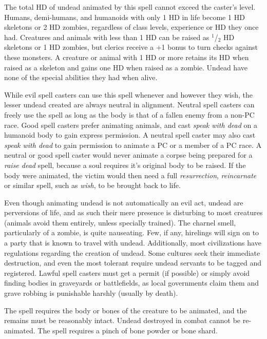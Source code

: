 \begin{multicols}{2}
The total HD of undead animated by this spell cannot exceed the caster's level.  Humans, demi-humans, and humanoids with only 1 HD in life become 1 HD skeletons or 2 HD zombies, regardless of class levels, experience or HD they once had.  Creatures and animals with less than 1 HD can be raised as $^1$/$_2$ HD skeletons or 1 HD zombies, but clerics receive a +1 bonus to turn checks against these monsters.  A creature or animal with 1 HD or more retains its HD when raised as a skeleton and gains one HD when raised as a zombie.  Undead have none of the special abilities they had when alive.  

While evil spell casters can use this spell whenever and however they wish, the lesser undead created are always neutral in alignment.  Neutral spell casters can freely use the spell as long as the body is that of a fallen enemy from a non-PC race.  Good spell casters prefer animating animals, and cast \textit{speak with dead} on a humanoid body to gain express permission.  A neutral spell caster may also cast \textit{speak with dead} to gain permission to animate a PC or a member of a PC race.  A neutral or good spell caster would never animate a corpse being prepared for a \textit{raise dead} spell, because a soul requires it's original body to be raised.  If the body were animated, the victim would then need a full \textit{resurrection}, \textit{reincarnate} or similar spell, such as \textit{wish}, to be brought back to life.

Even though animating undead is not automatically an evil act, undead are perversions of life, and as such their mere presence is disturbing to most creatures (animals avoid them entirely, unless specially trained).  The charnel smell, particularly of a zombie, is quite nauseating.  Few, if any, hirelings will sign on to a party that is known to travel with undead.  Additionally, most civilizations have regulations regarding the creation of undead.  Some cultures seek their immediate destruction, and even the most tolerant require undead servants to be tagged and registered.  Lawful spell casters must get a permit (if possible) or simply avoid finding bodies in graveyards or battlefields, as local governments claim them and grave robbing is punishable harshly (usually by death).
 
The spell requires the body or bones of the creature to be animated, and the remains must be reasonably intact.  Undead destroyed in combat cannot be re-animated.  The spell requires a pinch of bone powder or bone shard.  


\end{multicols}
